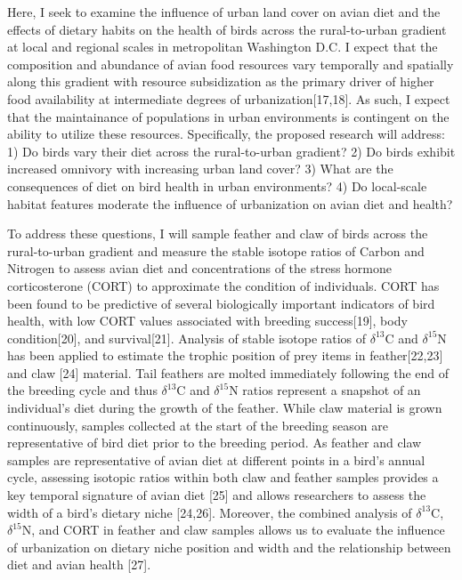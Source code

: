 \documentclass[12pt]{article}
\begin{document}

 Here, I seek to examine the influence of urban land cover on avian diet and the effects of dietary habits on the health of birds across the rural-to-urban gradient at local and regional scales in metropolitan Washington D.C. I expect that the composition and abundance of avian food resources vary temporally and spatially along this gradient with resource subsidization as the primary driver of higher food availability at intermediate degrees of urbanization[17,18]. As such, I expect that the maintainance of populations in urban environments is contingent on the ability to utilize these resources. Specifically, the proposed research will address:  1) Do birds vary their diet across the rural-to-urban gradient? 2) Do birds exhibit increased omnivory with increasing urban land cover? 3) What are the consequences of diet on bird health in  urban environments? 4) Do local-scale habitat features moderate the influence of urbanization on avian diet and health? \par

To address these questions, I will sample feather and claw of birds across the rural-to-urban gradient and measure the stable isotope ratios of Carbon and Nitrogen to assess avian diet and concentrations of the stress hormone corticosterone (CORT) to approximate the condition of individuals. CORT has been found to be predictive of several biologically important indicators of bird health, with low CORT values associated with breeding success[19], body condition[20], and survival[21]. Analysis of stable isotope ratios of $\delta^{13}$C and $\delta^{15}$N has been applied to estimate the trophic position of prey items in feather[22,23] and claw [24] material. Tail feathers are molted immediately following the end of the breeding cycle and thus $\delta^{13}$C and $\delta^{15}$N ratios represent a snapshot of an individual's diet during the growth of the feather. While claw material is grown continuously, samples collected at the start of the breeding season are representative of bird diet prior to the breeding period. As feather and claw samples are representative of avian diet at different points in a bird's annual cycle, assessing isotopic ratios within both claw and feather samples provides a key temporal signature of avian diet [25] and allows researchers to assess the width of a bird's dietary niche [24,26]. Moreover, the combined analysis of $\delta^{13}$C, $\delta^{15}$N, and CORT in feather and claw samples allows us to evaluate the influence of urbanization on dietary niche position and width and the relationship between diet and avian health [27].\par
\end{document}
